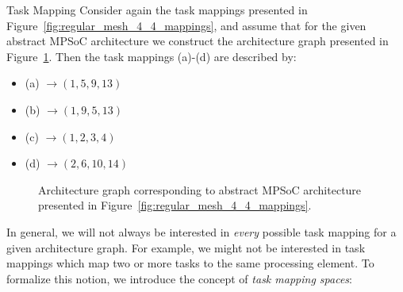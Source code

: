 \begin{exmp}[label=exmp:task_mapping]{Task Mapping}
  Consider again the task mappings presented in
  Figure~\ref{fig:regular_mesh_4_4_mappings}, and assume that for the given
  abstract MPSoC architecture we construct the architecture graph
  presented in Figure~\ref{fig:architecture_graph_4_4}. Then the task mappings
  (a)-(d) are described by:
  \begin{itemize}
    \item (a) $\rightarrow (1, 5, 9, 13)$
    \item (b) $\rightarrow (1, 9, 5, 13)$
    \item (c) $\rightarrow (1, 2, 3, 4)$
    \item (d) $\rightarrow (2, 6, 10, 14)$
  \end{itemize}
  \begin{figure}[H]
    \centering
    \caption{Architecture graph corresponding to abstract MPSoC architecture
             presented in Figure~\ref{fig:regular_mesh_4_4_mappings}.}
    \label{fig:architecture_graph_4_4}
  \end{figure}
\end{exmp}
%
In general, we will not always be interested in \textit{every} possible task
mapping for a given architecture graph. For example, we might not be interested
in task mappings which map two or more tasks to the same processing element.
To formalize this notion, we introduce the concept of \textit{task mapping spaces}:

